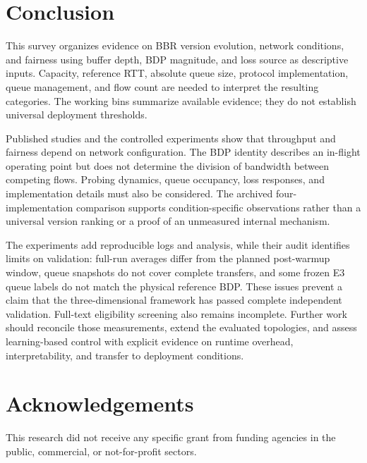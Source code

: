 \documentclass[a4paper,fleqn]{cas-sc}
\begin{document}


\section{Conclusion}
\label{sec:conclusion}

This survey organizes evidence on BBR version evolution, network conditions,
and fairness using buffer depth, BDP magnitude, and loss source as descriptive
inputs. Capacity, reference RTT, absolute queue size, protocol implementation,
queue management, and flow count are needed to interpret the resulting
categories. The working bins summarize available evidence; they do not
establish universal deployment thresholds.

Published studies and the controlled experiments show that throughput and
fairness depend on network configuration. The BDP identity describes an
in-flight operating point but does not determine the division of bandwidth
between competing flows. Probing dynamics, queue occupancy, loss responses,
and implementation details must also be considered. The archived four-implementation
comparison supports condition-specific observations rather than a universal
version ranking or a proof of an unmeasured internal mechanism.

The experiments add reproducible logs and analysis, while their audit identifies
limits on validation: full-run averages differ from the planned post-warmup
window, queue snapshots do not cover complete transfers, and some frozen E3
queue labels do not match the physical reference BDP. These issues prevent a
claim that the three-dimensional framework has passed complete independent
validation. Full-text eligibility screening also remains incomplete. Further
work should reconcile those measurements, extend the evaluated topologies,
and assess learning-based control with explicit evidence on runtime overhead,
interpretability, and transfer to deployment conditions.

\section*{Acknowledgements}
This research did not receive any specific grant from funding agencies in the
public, commercial, or not-for-profit sectors.
\end{document}
